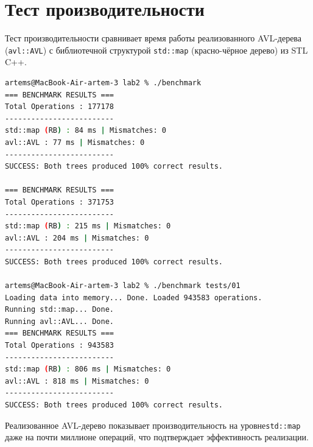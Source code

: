 \section{Тест производительности}
Тест производительности сравнивает время работы реализованного AVL-дерева (\texttt{avl::AVL}) с библиотечной структурой \texttt{std::map} (красно-чёрное дерево) из STL C++.

\begin{lstlisting}[language=bash]
artems@MacBook-Air-artem-3 lab2 % ./benchmark
=== BENCHMARK RESULTS ===
Total Operations : 177178
-------------------------
std::map (RB) : 84 ms | Mismatches: 0
avl::AVL : 77 ms | Mismatches: 0
-------------------------
SUCCESS: Both trees produced 100% correct results.

=== BENCHMARK RESULTS ===
Total Operations : 371753
-------------------------
std::map (RB) : 215 ms | Mismatches: 0
avl::AVL : 204 ms | Mismatches: 0
-------------------------
SUCCESS: Both trees produced 100% correct results.

artems@MacBook-Air-artem-3 lab2 % ./benchmark tests/01
Loading data into memory... Done. Loaded 943583 operations.
Running std::map... Done.
Running avl::AVL... Done.
=== BENCHMARK RESULTS ===
Total Operations : 943583
-------------------------
std::map (RB) : 806 ms | Mismatches: 0
avl::AVL : 818 ms | Mismatches: 0
-------------------------
SUCCESS: Both trees produced 100% correct results.
\end{lstlisting}

Реализованное AVL-дерево показывает производительность на уровне\texttt{std::map} даже на почти миллионе операций, что подтверждает эффективность реализации.
\pagebreak